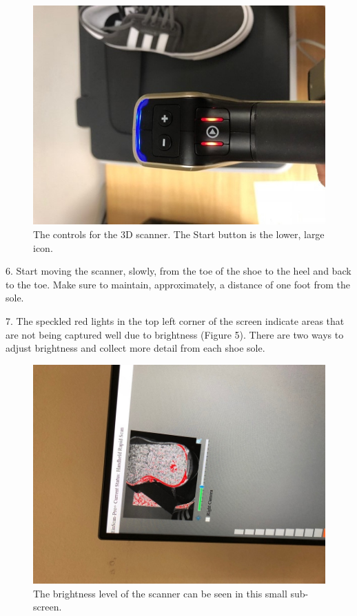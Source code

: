 \begin{figure}[!htp]
\centering
\includegraphics[scale=1, angle=270]{3D_Start_Button}
\caption{The controls for the 3D scanner. The Start button is the lower, large icon.}
\label{Image 4}
\end{figure}

\newpage

6. Start moving the scanner, slowly, from the toe of the shoe to the heel and back to the toe. Make sure to maintain, approximately, a distance of one foot from the sole.

7. The speckled red lights in the top left corner of the screen indicate areas that are not being captured well due to brightness (Figure 5). There are two ways to adjust brightness and collect more detail from each shoe sole.

\begin{figure}[!htp]
\centering
\includegraphics[scale=.75, angle=270]{3D_Brightness}
\caption{The brightness level of the scanner can be seen in this small sub-screen.}
\label{Image 5}
\end{figure}

